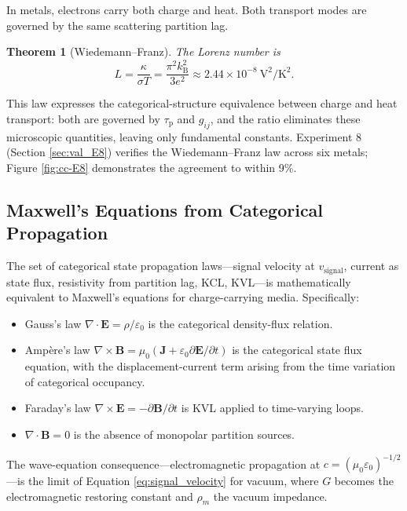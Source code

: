 \documentclass[twocolumn,10pt,a4paper]{article}
\newtheorem{theorem}{Theorem}[section]
\theoremstyle{definition}
\theoremstyle{remark}
\newcommand{\kB}{k_{\mathrm{B}}}
\newcommand{\tauP}{\tau_{\mathrm{p}}}
\begin{document}
In metals, electrons carry both charge and heat. Both transport modes are governed by the same scattering partition lag.

\begin{theorem}[Wiedemann--Franz]
\label{thm:wf}
The Lorenz number is
\begin{equation}
L = \frac{\kappa}{\sigma T} = \frac{\pi^2 \kB^2}{3 e^2} \approx 2.44\times10^{-8}~\mathrm{V^2/K^2}.
\label{eq:wf}
\end{equation}
\end{theorem}

This law \citep{wiedemann1853,lorenz1872,sommerfeld1928} expresses the categorical-structure equivalence between charge and heat transport: both are governed by $\tauP$ and $g_{ij}$, and the ratio eliminates these microscopic quantities, leaving only fundamental constants. Experiment 8 (Section \ref{sec:val_E8}) verifies the Wiedemann--Franz law across six metals; Figure \ref{fig:cc-E8} demonstrates the agreement to within 9\%.

\subsection{Maxwell's Equations from Categorical Propagation}

The set of categorical state propagation laws---signal velocity at $v_{\mathrm{signal}}$, current as state flux, resistivity from partition lag, KCL, KVL---is mathematically equivalent to Maxwell's equations \citep{maxwell1873,jackson1999} for charge-carrying media. Specifically:

\begin{itemize}[leftmargin=1.2em,nosep]
\item Gauss's law $\nabla \cdot \mathbf{E} = \rho/\varepsilon_0$ is the categorical density-flux relation.
\item Ampère's law $\nabla\times\mathbf{B} = \mu_0(\mathbf{J} + \varepsilon_0 \partial\mathbf{E}/\partial t)$ is the categorical state flux equation, with the displacement-current term arising from the time variation of categorical occupancy.
\item Faraday's law $\nabla\times\mathbf{E} = -\partial\mathbf{B}/\partial t$ is KVL applied to time-varying loops.
\item $\nabla\cdot\mathbf{B} = 0$ is the absence of monopolar partition sources.
\end{itemize}

The wave-equation consequence---electromagnetic propagation at $c = (\mu_0\varepsilon_0)^{-1/2}$---is the limit of Equation \eqref{eq:signal_velocity} for vacuum, where $G$ becomes the electromagnetic restoring constant and $\rho_m$ the vacuum impedance.
\end{document}

